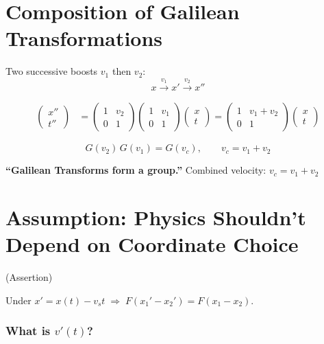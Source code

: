 \section*{Composition of Galilean Transformations}

Two successive boosts $v_1$ then $v_2$:
\[
  x \xrightarrow{v_1} x' \xrightarrow{v_2} x''
\]

\begin{align*}
  \begin{pmatrix} x'' \\ t'' \end{pmatrix}
  &= \begin{pmatrix} 1 & v_2 \\ 0 & 1 \end{pmatrix}
     \begin{pmatrix} 1 & v_1 \\ 0 & 1 \end{pmatrix}
     \begin{pmatrix} x \\ t \end{pmatrix}
   = \begin{pmatrix} 1 & v_1 + v_2 \\ 0 & 1 \end{pmatrix}
     \begin{pmatrix} x \\ t \end{pmatrix}
\end{align*}

\[
  G(v_2)\,G(v_1) = G(v_c), \qquad v_c = v_1 + v_2
\]

\begin{tcolorbox}
  \textbf{``Galilean Transforms form a group.''} \hfill Combined velocity: $v_c = v_1 + v_2$
\end{tcolorbox}

\section*{Assumption: Physics Shouldn't Depend on Coordinate Choice}

(Assertion)

Under $x' = x(t) - v_s t \;\Rightarrow\; F(x_1' - x_2') = F(x_1 - x_2)$.

\subsubsection*{What is $v'(t)$?}

